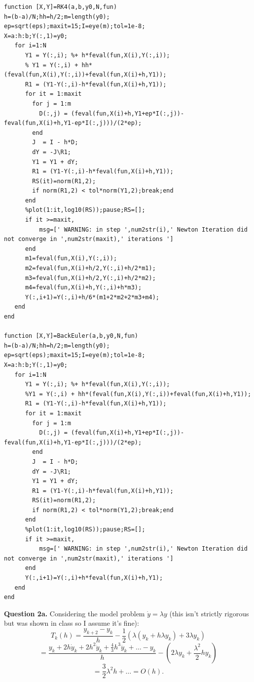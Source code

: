 \documentclass[letterpaper, reqno,11pt]{article}
\begin{document}
\begin{lstlisting}
function [X,Y]=RK4(a,b,y0,N,fun)
h=(b-a)/N;hh=h/2;m=length(y0);
ep=sqrt(eps);maxit=15;I=eye(m);tol=1e-8;
X=a:h:b;Y(:,1)=y0;
   for i=1:N
      Y1 = Y(:,i); %+ h*feval(fun,X(i),Y(:,i));
      % Y1 = Y(:,i) + hh*(feval(fun,X(i),Y(:,i))+feval(fun,X(i)+h,Y1));
      R1 = (Y1-Y(:,i)-h*feval(fun,X(i)+h,Y1));
      for it = 1:maxit 
        for j = 1:m
          D(:,j) = (feval(fun,X(i)+h,Y1+ep*I(:,j))-feval(fun,X(i)+h,Y1-ep*I(:,j)))/(2*ep);
        end
        J  = I - h*D;
        dY = -J\R1;
        Y1 = Y1 + dY;
        R1 = (Y1-Y(:,i)-h*feval(fun,X(i)+h,Y1));
        RS(it)=norm(R1,2);
        if norm(R1,2) < tol*norm(Y1,2);break;end
      end
      %plot(1:it,log10(RS));pause;RS=[];
      if it >=maxit,
          msg=[' WARNING: in step ',num2str(i),' Newton Iteration did not converge in ',num2str(maxit),' iterations ']
      end
      m1=feval(fun,X(i),Y(:,i));
      m2=feval(fun,X(i)+h/2,Y(:,i)+h/2*m1);
      m3=feval(fun,X(i)+h/2,Y(:,i)+h/2*m2);
      m4=feval(fun,X(i)+h,Y(:,i)+h*m3);
      Y(:,i+1)=Y(:,i)+h/6*(m1+2*m2+2*m3+m4);
   end
end

function [X,Y]=BackEuler(a,b,y0,N,fun)
h=(b-a)/N;hh=h/2;m=length(y0);
ep=sqrt(eps);maxit=15;I=eye(m);tol=1e-8;
X=a:h:b;Y(:,1)=y0;
   for i=1:N
      Y1 = Y(:,i); %+ h*feval(fun,X(i),Y(:,i));
      %Y1 = Y(:,i) + hh*(feval(fun,X(i),Y(:,i))+feval(fun,X(i)+h,Y1));
      R1 = (Y1-Y(:,i)-h*feval(fun,X(i)+h,Y1));
      for it = 1:maxit 
        for j = 1:m
          D(:,j) = (feval(fun,X(i)+h,Y1+ep*I(:,j))-feval(fun,X(i)+h,Y1-ep*I(:,j)))/(2*ep);
        end
        J  = I - h*D;
        dY = -J\R1;
        Y1 = Y1 + dY;
        R1 = (Y1-Y(:,i)-h*feval(fun,X(i)+h,Y1));
        RS(it)=norm(R1,2);
        if norm(R1,2) < tol*norm(Y1,2);break;end
      end
      %plot(1:it,log10(RS));pause;RS=[];
      if it >=maxit,
          msg=[' WARNING: in step ',num2str(i),' Newton Iteration did not converge in ',num2str(maxit),' iterations ']
      end
      Y(:,i+1)=Y(:,i)+h*feval(fun,X(i)+h,Y1);
   end
end
\end{lstlisting}

{\medskip\noindent\bf Question 2a.} Considering the model problem $\dot y=\lambda y$ (this isn't strictly rigorous but was shown in class so I assume it's fine):
\[
T_k(h)=\frac{y_{k+2}-y_k}{h}-\frac{1}{2}(\lambda(y_{k}+h\lambda y_k)+3\lambda y_k)
\]
\[
=\frac{y_k+2h\dot y_k+ 2h^2\ddot y_k+ \frac{4}{3}h^3\dddot y_k+\ldots-y_k}{h}-(2\lambda y_k+\frac{\lambda^2}{2}h y_k)
\]
\[
=\frac{3}{2}\lambda^2h+\ldots=O(h)
.\]
\end{document}
